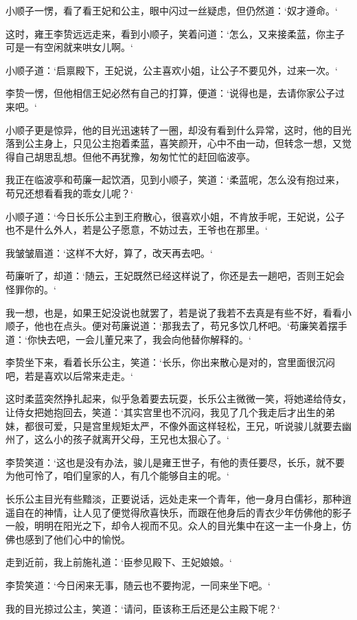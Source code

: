 小顺子一愣，看了看王妃和公主，眼中闪过一丝疑虑，但仍然道：‘奴才遵命。‘

这时，雍王李贽远远走来，看到小顺子，笑着问道：‘怎么，又来接柔蓝，你主子可是一有空闲就来哄女儿啊。‘

小顺子道：‘启禀殿下，王妃说，公主喜欢小姐，让公子不要见外，过来一次。‘

李贽一愣，但他相信王妃必然有自己的打算，便道：‘说得也是，去请你家公子过来吧。‘

小顺子更是惊异，他的目光迅速转了一圈，却没有看到什么异常，这时，他的目光落到公主身上，只见公主抱着柔蓝，喜笑颜开，心中不由一动，但转念一想，又觉得自己胡思乱想。但他不再犹豫，匆匆忙忙的赶回临波亭。

我正在临波亭和苟廉一起饮酒，见到小顺子，笑道：‘柔蓝呢，怎么没有抱过来，苟兄还想看看我的乖女儿呢？‘

小顺子道：‘今日长乐公主到王府散心，很喜欢小姐，不肯放手呢，王妃说，公子也不是什么外人，若是公子愿意，不妨过去，王爷也在那里。‘

我皱皱眉道：‘这样不大好，算了，改天再去吧。‘

苟廉听了，却道：‘随云，王妃既然已经这样说了，你还是去一趟吧，否则王妃会怪罪你的。‘

我一想，也是，如果王妃没说也就罢了，若是说了我若不去真是有些不好，看看小顺子，他也在点头。便对苟廉说道：‘那我去了，苟兄多饮几杯吧。‘苟廉笑着摆手道：‘你快去吧，一会儿董兄来了，我会向他替你解释的。‘

李贽坐下来，看着长乐公主，笑道：‘长乐，你出来散心是对的，宫里面很沉闷吧，若是喜欢以后常来走走。‘

这时柔蓝突然挣扎起来，似乎急着要去玩耍，长乐公主微微一笑，将她递给侍女，让侍女把她抱回去，笑道：‘其实宫里也不沉闷，我见了几个我走后才出生的弟妹，都很可爱，只是宫里规矩太严，不像外面这样轻松，王兄，听说骏儿就要去幽州了，这么小的孩子就离开父母，王兄也太狠心了。‘

李贽笑道：‘这也是没有办法，骏儿是雍王世子，有他的责任要尽，长乐，就不要为他可怜了，咱们皇家的人，有几个能够自主的呢。‘

长乐公主目光有些黯淡，正要说话，远处走来一个青年，他一身月白儒衫，那种逍遥自在的神情，让人见了便觉得欣喜快乐，而跟在他身后的青衣少年仿佛他的影子一般，明明在阳光之下，却令人视而不见。众人的目光集中在这一主一仆身上，仿佛也感到了他们心中的愉悦。

走到近前，我上前施礼道：‘臣参见殿下、王妃娘娘。‘

李贽笑道：‘今日闲来无事，随云也不要拘泥，一同来坐下吧。‘

我的目光掠过公主，笑道：‘请问，臣该称王后还是公主殿下呢？‘

